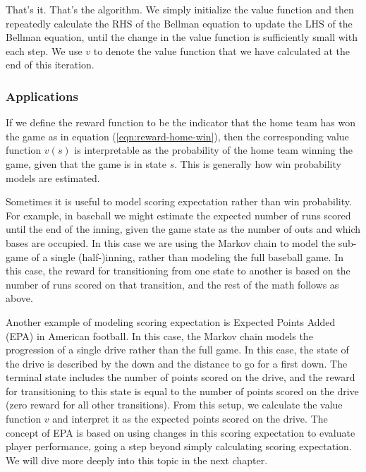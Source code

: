 \documentclass{article}
\begin{document}
      That's it. That's the algorithm. We simply initialize the value function and then repeatedly calculate the RHS of the Bellman equation to update the LHS of the Bellman equation, until the change in the value function is sufficiently small with each step. We use $v$ to denote the value function that we have calculated at the end of this iteration.

    \subsubsection{\sc Applications}

      If we define the reward function to be the indicator that the home team has won the game as in equation (\ref{eqn:reward-home-win}), then the corresponding value function $v(s)$ is interpretable as the probability of the home team winning the game, given that the game is in state $s$. This is generally how win probability models are estimated.

      Sometimes it is useful to model scoring expectation rather than win probability. For example, in baseball we might estimate the expected number of runs scored until the end of the inning, given the game state as the number of outs and which bases are occupied. In this case we are using the Markov chain to model the sub-game of a single (half-)inning, rather than modeling the full baseball game. In this case, the reward for transitioning from one state to another is based on the number of runs scored on that transition, and the rest of the math follows as above.

      Another example of modeling scoring expectation is Expected Points Added (EPA) in American football. In this case, the Markov chain models the progression of a single drive rather than the full game. In this case, the state of the drive is described by the down and the distance to go for a first down. The terminal state includes the number of points scored on the drive, and the reward for transitioning to this state is equal to the number of points scored on the drive (zero reward for all other transitions). From this setup, we calculate the value function $v$ and interpret it as the expected points scored on the drive. The concept of EPA is based on using changes in this scoring expectation to evaluate player performance, going a step beyond simply calculating scoring expectation. We will dive more deeply into this topic in the next chapter.
\end{document}
